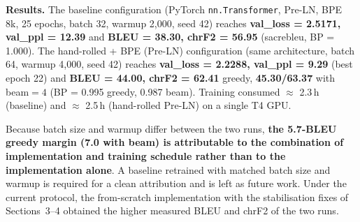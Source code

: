 \documentclass[10pt]{article}
\begin{document}
\textbf{Results.} The baseline configuration (PyTorch \texttt{nn.Transformer}, Pre-LN, BPE 8k, 25 epochs, batch 32, warmup 2{,}000, seed 42) reaches \textbf{val\_loss = 2.5171, val\_ppl = 12.39} and \textbf{BLEU = 38.30, chrF2 = 56.95} (sacrebleu, BP = 1.000). The hand-rolled + BPE (Pre-LN) configuration (same architecture, batch 64, warmup 4{,}000, seed 42) reaches \textbf{val\_loss = 2.2288, val\_ppl = 9.29} (best epoch 22) and \textbf{BLEU = 44.00, chrF2 = 62.41} greedy, \textbf{45.30/63.37} with beam$=4$ (BP = 0.995 greedy, 0.987 beam). Training consumed $\approx$ 2.3\,h (baseline) and $\approx$ 2.5\,h (hand-rolled Pre-LN) on a single T4 GPU.

Because batch size and warmup differ between the two runs, \textbf{the 5.7-BLEU greedy margin (7.0 with beam) is attributable to the combination of implementation and training schedule rather than to the implementation alone}. A baseline retrained with matched batch size and warmup is required for a clean attribution and is left as future work. Under the current protocol, the from-scratch implementation with the stabilisation fixes of Sections~3--4 obtained the higher measured BLEU and chrF2 of the two runs.

\begin{table}[htbp]
\centering
{}
\caption{Baseline comparison on the Tatoeba EN$\rightarrow$DE test set. Rows differ in more than one factor (tokenization, LN convention, epochs, batch, warmup), so the 16$\times$ drop in validation perplexity from the word-level diagnostic (149.84) to the main configuration (9.29) reflects the joint effect of subword tokenization, Pre-LN stabilisation, corrected warmup, and longer training; it does not isolate any single factor. The 5.7 BLEU margin over the baseline (38.30 $\rightarrow$ 44.00) additionally mixes implementation and schedule effects (Section~6.7). Beam search (beam = 4) adds a further +1.3 BLEU over greedy decoding on the hand-rolled model.}
\label{tab:baseline-results}
\end{table}
\end{document}
